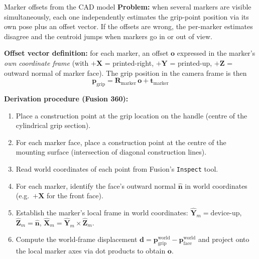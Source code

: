 \documentclass[10pt,aspectratio=169]{beamer}
\begin{document}
\begin{frame}{Marker offsets from the CAD model}
\textbf{Problem:} when several markers are visible simultaneously, each one independently estimates the grip-point position via its own pose plus an offset vector. If the offsets are wrong, the per-marker estimates disagree and the centroid jumps when markers go in or out of view.

\textbf{Offset vector definition:} for each marker, an offset $\mathbf{o}$ expressed in the marker's \emph{own coordinate frame} (with $+\mathbf{X}$ = printed-right, $+\mathbf{Y}$ = printed-up, $+\mathbf{Z}$ = outward normal of marker face). The grip position in the camera frame is then
\[
\mathbf{p}_{\text{grip}} = \mathbf{R}_{\text{marker}} \, \mathbf{o} + \mathbf{t}_{\text{marker}}
\]

\textbf{Derivation procedure (Fusion 360):}
\begin{enumerate}
    \item Place a construction point at the grip location on the handle (centre of the cylindrical grip section).
    \item For each marker face, place a construction point at the centre of the mounting surface (intersection of diagonal construction lines).
    \item Read world coordinates of each point from Fusion's \texttt{Inspect} tool.
    \item For each marker, identify the face's outward normal $\hat{\mathbf{n}}$ in world coordinates (e.g.\ $+\mathbf{X}$ for the front face).
    \item Establish the marker's local frame in world coordinates: $\hat{\mathbf{Y}}_m = \text{device-up}$, $\hat{\mathbf{Z}}_m = \hat{\mathbf{n}}$, $\hat{\mathbf{X}}_m = \hat{\mathbf{Y}}_m \times \hat{\mathbf{Z}}_m$.
    \item Compute the world-frame displacement $\mathbf{d} = \mathbf{p}_{\text{grip}}^{\text{world}} - \mathbf{p}_{\text{face}}^{\text{world}}$ and project onto the local marker axes via dot products to obtain $\mathbf{o}$.
\end{enumerate}
\end{frame}
\end{document}
